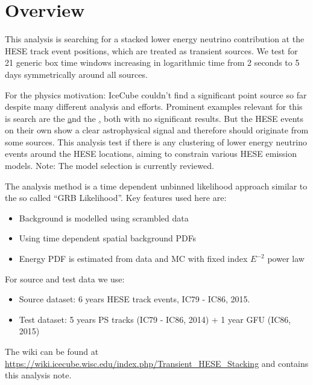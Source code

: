 

% 








\section{Overview}
This analysis is searching for a stacked lower energy neutrino contribution at the HESE track event positions, which are treated as transient sources.
We test for 21 generic box time windows increasing in logarithmic time from 2 seconds to 5 days symmetrically around all sources.

For the physics motivation: IceCube couldn't find a significant point source so far despite many different analysis and efforts.
Prominent examples relevant for this is search are the \href{time integrated 7 year point source search} and the \href{HESE 6 year point source search}, both with no significant results.
But the HESE events on their own show a clear astrophysical signal and therefore should originate from some sources.
This analysis test if there is any clustering of lower energy neutrino events around the HESE locations, aiming to constrain various HESE emission models.
\textcolor{nordred}{Note: The model selection is currently reviewed}.

The analysis method is a time dependent unbinned likelihood approach similar to the so called \enquote{GRB Likelihood}.
Key features used here are:
\begin{itemize}
  \item Background is modelled using scrambled data
  \item Using time dependent spatial background PDFs
  \item Energy PDF is estimated from data and MC with fixed index $E^{-2}$ power law
\end{itemize}

For source and test data we use:
\begin{itemize}
  \item Source dataset: 6 years HESE track events, IC79 - IC86, 2015.
  \item Test dataset: 5 years PS tracks (IC79 - IC86, 2014) + 1 year GFU (IC86, 2015)
\end{itemize}

The wiki can be found at \url{https://wiki.icecube.wisc.edu/index.php/Transient_HESE_Stacking} and contains this analysis note.



